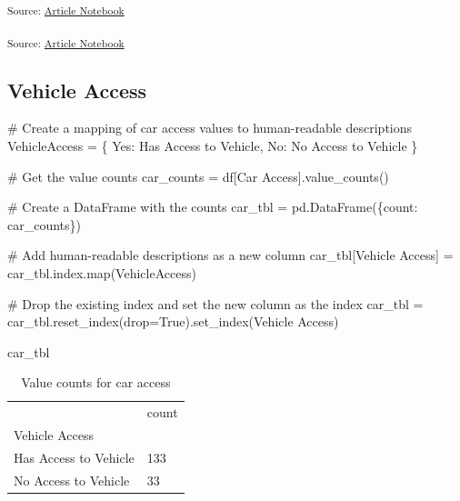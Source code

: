 \documentclass[
  letterpaper,
  DIV=11,
  numbers=noendperiod]{scrartcl}
\newenvironment{Shaded}{\begin{snugshade}}{\end{snugshade}}
\newcommand{\BuiltInTok}[1]{\textcolor[rgb]{0.00,0.23,0.31}{#1}}
\newcommand{\CommentTok}[1]{\textcolor[rgb]{0.37,0.37,0.37}{#1}}
\newcommand{\NormalTok}[1]{\textcolor[rgb]{0.00,0.23,0.31}{#1}}
\newcommand{\OperatorTok}[1]{\textcolor[rgb]{0.37,0.37,0.37}{#1}}
\newcommand{\StringTok}[1]{\textcolor[rgb]{0.13,0.47,0.30}{#1}}
\newcommand{\VariableTok}[1]{\textcolor[rgb]{0.07,0.07,0.07}{#1}}
\begin{document}
\textsubscript{Source:
\href{https://RachelRapier.github.io/psych_755_project/index.qmd.html}{Article
Notebook}}

\textsubscript{Source:
\href{https://RachelRapier.github.io/psych_755_project/index.qmd.html}{Article
Notebook}}

\subsection{Vehicle Access}\label{vehicle-access}

\begin{Shaded}
\begin{Highlighting}[]
\CommentTok{\# Create a mapping of car access values to human{-}readable descriptions}
\NormalTok{VehicleAccess }\OperatorTok{=}\NormalTok{ \{}
    \StringTok{\textquotesingle{}Yes\textquotesingle{}}\NormalTok{: }\StringTok{\textquotesingle{}Has Access to Vehicle\textquotesingle{}}\NormalTok{,}
    \StringTok{\textquotesingle{}No\textquotesingle{}}\NormalTok{: }\StringTok{\textquotesingle{}No Access to Vehicle\textquotesingle{}}
\NormalTok{\}}

\CommentTok{\# Get the value counts}
\NormalTok{car\_counts }\OperatorTok{=}\NormalTok{ df[}\StringTok{\textquotesingle{}Car Access\textquotesingle{}}\NormalTok{].value\_counts()}

\CommentTok{\# Create a DataFrame with the counts}
\NormalTok{car\_tbl }\OperatorTok{=}\NormalTok{ pd.DataFrame(\{}\StringTok{\textquotesingle{}count\textquotesingle{}}\NormalTok{: car\_counts\})}

\CommentTok{\# Add human{-}readable descriptions as a new column}
\NormalTok{car\_tbl[}\StringTok{\textquotesingle{}Vehicle Access\textquotesingle{}}\NormalTok{] }\OperatorTok{=}\NormalTok{ car\_tbl.index.}\BuiltInTok{map}\NormalTok{(VehicleAccess)}

\CommentTok{\# Drop the existing index and set the new column as the index}
\NormalTok{car\_tbl }\OperatorTok{=}\NormalTok{ car\_tbl.reset\_index(drop}\OperatorTok{=}\VariableTok{True}\NormalTok{).set\_index(}\StringTok{\textquotesingle{}Vehicle Access\textquotesingle{}}\NormalTok{)}

\NormalTok{car\_tbl}
\end{Highlighting}
\end{Shaded}

{

\begin{longtable}[]{@{}ll@{}}

\caption{\label{tbl-valuecounts-car}Value counts for car access}

\tabularnewline

\toprule\noalign{}
& count \\
Vehicle Access & \\
\midrule\noalign{}
\endhead
\bottomrule\noalign{}
\endlastfoot
Has Access to Vehicle & 133 \\
No Access to Vehicle & 33 \\

\end{longtable}

}
\end{document}

